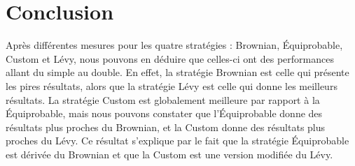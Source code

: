 \section{Conclusion}

Après différentes mesures pour les quatre stratégies : Brownian,
\'{E}quiprobable, Custom et Lévy, nous pouvons en déduire que celles-ci
ont des performances allant du simple au double. En effet, la
stratégie Brownian est celle qui présente les pires résultats,
alors que la stratégie Lévy est celle qui donne les meilleurs
résultats. La stratégie Custom est globalement meilleure par
rapport à la \'{E}quiprobable, mais nous pouvons constater que l'\'{E}quiprobable
donne des résultats plus proches du Brownian, et la Custom donne
des résultats plus proches du Lévy. Ce résultat s'explique par le
fait que la stratégie \'{E}quiprobable est dérivée du Brownian et
que la Custom est une version modifiée du Lévy.
